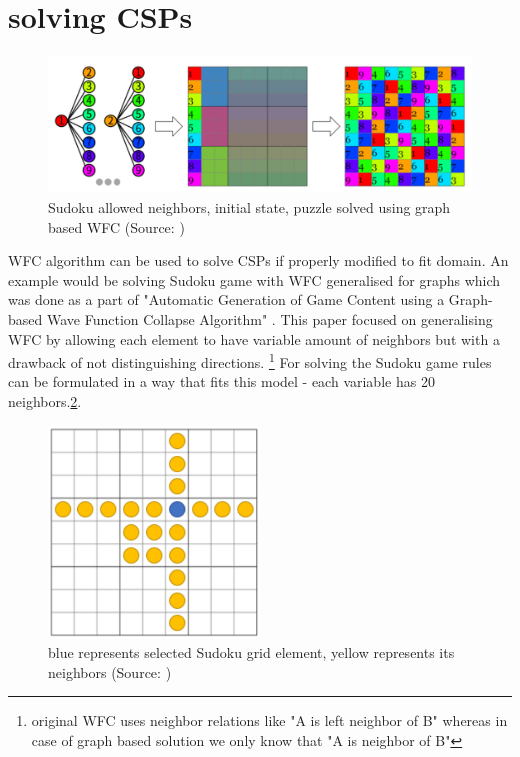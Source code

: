\documentclass[shortabstract, english, inz]{iithesis}
\begin{document}
\section{solving CSPs}
\begin{figure}[H]
\centering
\includegraphics[width=1\textwidth, angle=0]{images/sudoku_solver.png}
\caption{Sudoku allowed neighbors, initial state, puzzle solved using graph based WFC (Source: \cite{GraphBased})}
\label{fig:sudoku_solver}
\end{figure}
WFC algorithm can be used to solve CSPs if properly modified to fit domain. An example would be solving Sudoku game with WFC generalised for graphs which was done as a part of "Automatic Generation of Game Content using a Graph-based Wave Function Collapse Algorithm" \cite{GraphBased}. This paper focused on generalising WFC by allowing each element to have variable amount of neighbors but with a drawback of not distinguishing directions. \footnote{original WFC uses neighbor relations like "A is left neighbor of B" whereas in case of graph based solution we only know that "A is neighbor of B"} For solving the Sudoku game rules can be formulated in a way that fits this model - each variable has 20 neighbors.\ref{fig:sudoku_neighbors}.
\begin{figure}[H]
\centering
\includegraphics[width=0.50\textwidth, angle=0]{images/sudoku_neighbors.png}
\caption{blue represents selected Sudoku grid element, yellow represents its neighbors (Source: \cite{GraphBased})}
\label{fig:sudoku_neighbors}
\end{figure}
\end{document}
